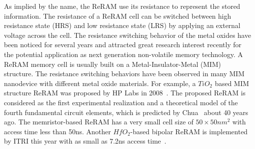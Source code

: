 As implied by the name, the ReRAM use its resistance to represent the stored information. The resistance of a ReRAM cell can be switched between high resistance state (HRS) and low resistance state (LRS) by applying an external voltage across the cell. The resistance switching behavior of the metal oxides have been noticed for several years and attracted great research interest recently for the potential application as next generation non-volatile memory technology. A ReRAM memory cell is usually built on a Metal-Insulator-Metal (MIM) structure. The resistance switching behaviors have been observed in many MIM nanodevice with different metal oxide materials. For example, a $TiO_2$ based MIM structure ReRAM was proposed by HP Labs in 2008~\cite{memristor:missing}. The proposed ReRAM is considered as the first experimental realization and a theoretical model of the fourth fundamental circuit elements, which is predicted by Chua~\cite{memristor:chua} about 40 years ago. The memristor-based ReRAM has a very small cell size of $50\times50 nm^2$ with access time less than 50ns. Another $HfO_2$-based bipolar ReRAM is implemented by ITRI this year with as small as 7.2ns access time~\cite{memristor:ISSCC2011_ITRI}.


